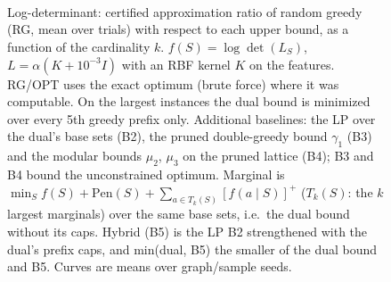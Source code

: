\begin{figure}[t]
\centering
\setlength{\rgplotwidth}{0.49\columnwidth}
\\[1pt]
\hfill
\\
\hfill
\\

\caption{Log-determinant: certified approximation ratio of random greedy (RG, mean over trials) with respect to each upper bound, as a function of the cardinality $k$. $f(S)=\log\det(L_S)$, $L=\alpha(K+10^{-3}I)$ with an RBF kernel $K$ on the features. RG/OPT uses the exact optimum (brute force) where it was computable. On the largest instances the dual bound is minimized over every 5th greedy prefix only. Additional baselines: the LP over the dual's base sets (B2), the pruned double-greedy bound $\gamma_1$ (B3) and the modular bounds $\mu_2$, $\mu_3$ on the pruned lattice (B4); B3 and B4 bound the unconstrained optimum. Marginal is $\min_S f(S)+\mathrm{Pen}(S)+\sum_{a\in T_k(S)}[f(a\mid S)]^+$ ($T_k(S)$: the $k$ largest marginals) over the same base sets, i.e.\ the dual bound without its caps. Hybrid (B5) is the LP B2 strengthened with the dual's prefix caps, and min(dual, B5) the smaller of the dual bound and B5. Curves are means over graph/sample seeds.}
\label{fig:rg-log_det-hybrid}
\end{figure}
